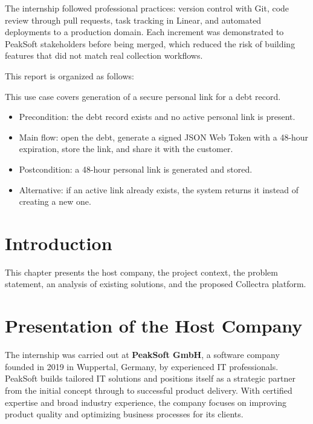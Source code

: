 ﻿\documentclass[12pt,a4paper]{report}
\begin{document}
The internship followed professional practices: version control with Git, code review through
pull requests, task tracking in Linear, and automated deployments to a production domain.
Each increment was demonstrated to PeakSoft stakeholders before being merged, which reduced
the risk of building features that did not match real collection workflows.

This report is organized as follows:

\noindent This use case covers generation of a secure personal link for a debt record.

\begin{itemize}
  \item Precondition: the debt record exists and no active personal link is present.
  \item Main flow: open the debt, generate a signed JSON Web Token with a 48-hour expiration, store the link, and share it with the customer.
  \item Postcondition: a 48-hour personal link is generated and stored.
  \item Alternative: if an active link already exists, the system returns it instead of creating a new one.
\end{itemize}

\section*{Introduction}
{}

This chapter presents the host company, the project context, the problem statement,
an analysis of existing solutions, and the proposed Collectra platform.

\section{Presentation of the Host Company}

The internship was carried out at \textbf{PeakSoft GmbH}, a software company
founded in 2019 in Wuppertal, Germany, by experienced IT professionals.
PeakSoft builds tailored IT solutions and positions itself as a strategic partner
from the initial concept through to successful product delivery.
With certified expertise and broad industry experience, the company focuses on
improving product quality and optimizing business processes for its clients.
\end{document}

